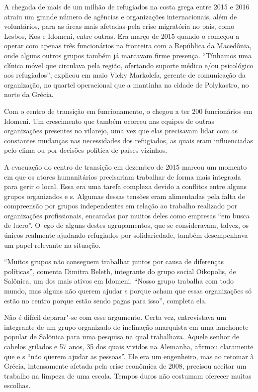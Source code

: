  

A chegada de mais de um milhão de refugiados na costa grega entre 2015 e
2016 atraiu um grande número de agências e organizações internacionais,
além de voluntários, para as áreas mais afetadas pela crise migratória
no país, como Lesbos, Kos e Idomeni, entre outras. Era março de 2015
quando o  começou a operar com apenas três funcionários na fronteira
com a República da Macedônia, onde alguns outros grupos também já
marcavam firme presença. ``Tínhamos uma clínica móvel que circulava pela
região, ofertando suporte médico e/ou psicológico aos refugiados'',
explicou em maio Vicky Markolefa, gerente de comunicação da organização,
no quartel operacional que a  mantinha na cidade de Polykastro, no
norte da Grécia.

Com o centro de transição em funcionamento, o  chegou a ter 200
funcionários em Idomeni. Um crescimento que também ocorreu nas equipes
de outras organizações presentes no vilarejo, uma vez que elas
precisavam lidar com as constantes mudanças nas necessidades dos
refugiados, as quais eram influenciadas pelo clima ou por decisões
política de países vizinhos.

A evacuação do centro de transição em dezembro de 2015 marcou um momento
em que os atores humanitários precisariam trabalhar de forma mais
integrada para gerir o local. Essa era uma tarefa complexa devido a
conflitos entre alguns grupos organizados e s. Algumas dessas tensões
eram alimentadas pela falta de compreensão por grupos independentes em
relação ao trabalho realizado por organizações profissionais, encaradas
por muitos deles como empresas ``em busca de lucro''. O~ego de alguns
destes agrupamentos, que se consideravam, talvez, os únicos realmente
ajudando refugiados por solidariedade, também desempenhava um papel
relevante na situação.

``Muitos grupos não conseguem trabalhar juntos por causa de diferenças
políticas'', comenta Dimitra Beleth, integrante do grupo social
Oikopolis, de Salônica, um dos mais ativos em Idomeni. ``Nosso grupo
trabalha com todo mundo, mas alguns não querem ajudar s porque acham
que essas organizações só estão no centro porque estão sendo pagas para
isso'', completa ela.

Não é difícil deparar"-se com esse argumento. Certa vez, entrevistava um
integrante de um grupo organizado de inclinação anarquista em uma
lanchonete popular de Salônica para uma pesquisa na qual trabalhava.
Aquele senhor de cabelos grilados e 57 anos, 35 dos quais vividos na
Alemanha, afirmou claramente que  e s ``não querem ajudar as
pessoas''. Ele era um engenheiro, mas ao retomar à Grécia, intensamente
afetada pela crise econômica de 2008, precisou aceitar um trabalho na
limpeza de uma escola. Tempos duros não costumam oferecer muitas
escolhas.

